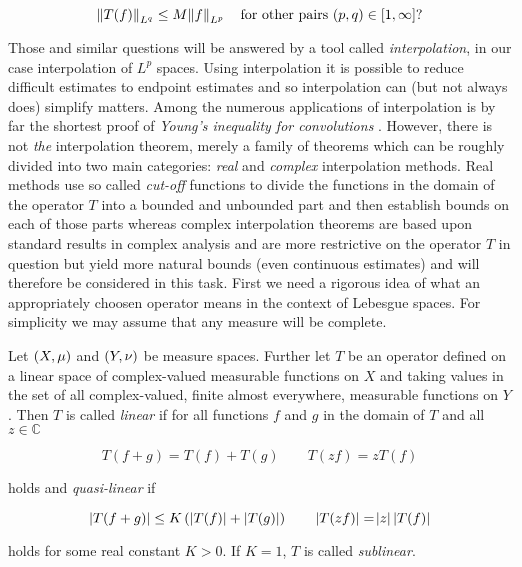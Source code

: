 \begin{equation*}
	\norm[0]{T(f)}_{L^q} \leq M \norm{f}_{L^p} \quad \text{for other pairs $\del{p,q} \in \intcc{1,\infty}$?} 
\end{equation*}

Those and similar questions will be answered by a tool called \emph{interpolation}, in our case interpolation of $L^p$ spaces. Using interpolation it is possible to reduce difficult estimates to endpoint estimates and so interpolation can (but not always does) simplify matters. Among the numerous applications of interpolation is by far the shortest proof of \emph{Young's inequality for convolutions} \textup{\cite[22--23]{grafakos:fourier:2014}}. However, there is not \emph{the} interpolation theorem, merely a family of theorems which can be 
roughly divided into two main categories: \emph{real} and \emph{complex} interpolation methods. Real methods use so called \emph{cut-off} functions to divide the functions in the domain of the operator $T$ into a bounded and unbounded part and then establish bounds on each of those parts whereas complex interpolation theorems are based upon standard results in complex analysis and are more restrictive on the operator $T$ in question but yield more natural bounds (even continuous estimates) and will therefore be considered in this task. First we need a rigorous idea of what an appropriately choosen operator means in the context of Lebesgue spaces. For simplicity we may assume that any measure will be complete. 

\vspace{2mm}

\begin{mdframed}
	\begin{definition}
		Let $\del{X,\mu}$ and $\del{Y,\nu}$ be measure spaces. Further let $T$ be an operator defined on a linear space of complex-valued measurable functions on $X$ and taking values in the set of all complex-valued, finite almost everywhere, measurable functions on $Y$. Then $T$ is called \emph{linear} if for all functions $f$ and $g$ in the domain of $T$ and all $z \in \mathbb{C}$

		\begin{equation}
			T(f + g) = T(f) + T(g) \qquad T(zf) = zT(f)
			\label{eq:linear}
		\end{equation}

		\noindent holds and \emph{quasi-linear} if

		\begin{equation}
			\abs[0]{T(f + g)} \leq K \del[0]{\abs[0]{ T(f)} + \abs[0]{ T(g)}} \qquad \abs[0]{ T(zf) } = \abs{z}\abs[0]{ T(f)}
			\label{eq:quasilinear}
		\end{equation}

		\noindent holds for some real constant $K > 0$. If $K = 1$, $T$ is called \emph{sublinear}.
	\end{definition}
\end{mdframed}

